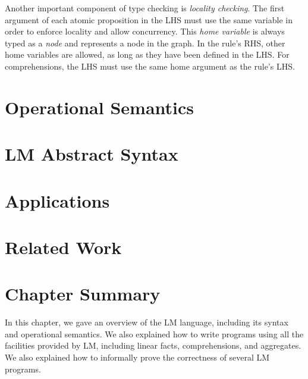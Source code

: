 Another important component of type checking is \emph{locality checking}. The
first argument of each atomic proposition in the LHS must use the same variable
in order to enforce locality and allow concurrency. This \emph{home variable} is
always typed as a \emph{node} and represents a node in the graph. In the rule's
RHS, other home variables are allowed, as long as they have been defined in the
LHS. For comprehensions, the LHS must use the same home argument as the rule's
LHS.

\section{Operational Semantics}\label{sec:language:semantics}


\section{LM Abstract Syntax}

\section{Applications}


\section{Related Work}\label{section:language:related}

\section{Chapter Summary}

In this chapter, we gave an overview of the LM language, including its syntax
and operational semantics. We also explained how to write programs using all the
facilities provided by LM, including linear facts, comprehensions, and
aggregates. We also explained how to informally prove the correctness of several
LM programs.

